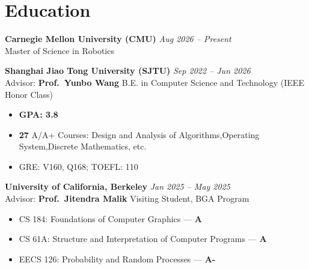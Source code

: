 \documentclass{chicv}
\begin{document}
\begin{basicinfo}
\end{basicinfo}
\section*{Education}

\textbf{Carnegie Mellon University (CMU)} \hfill \textit{Aug 2026 -- Present} \\
Master of Science in Robotics

\textbf{Shanghai Jiao Tong University (SJTU)} \hfill \textit{Sep 2022 -- Jun 2026} \\
Advisor: \textbf{Prof.\ Yunbo Wang} \hfill B.E. in Computer Science and Technology (IEEE Honor Class)
\begin{itemize}[noitemsep, topsep=0pt]
    \item \textbf{GPA: 3.8}
    \item \textbf{27} A/A+ Courses: Design and Analysis of Algorithms,Operating System,Discrete Mathematics, etc.
    \item GRE: V160, Q168; TOEFL: 110
\end{itemize}

\textbf{University of California, Berkeley} \hfill \textit{Jan 2025 -- May 2025} \\
Advisor: \textbf{Prof.\ Jitendra Malik} \hfill Visiting Student, BGA Program 
\begin{itemize}[noitemsep, topsep=0pt]
    \item CS 184: Foundations of Computer Graphics — \textbf{A}
    \item CS 61A: Structure and Interpretation of Computer Programs — \textbf{A}
    \item EECS 126: Probability and Random Processes — \textbf{A-}
\end{itemize}
\end{document}

